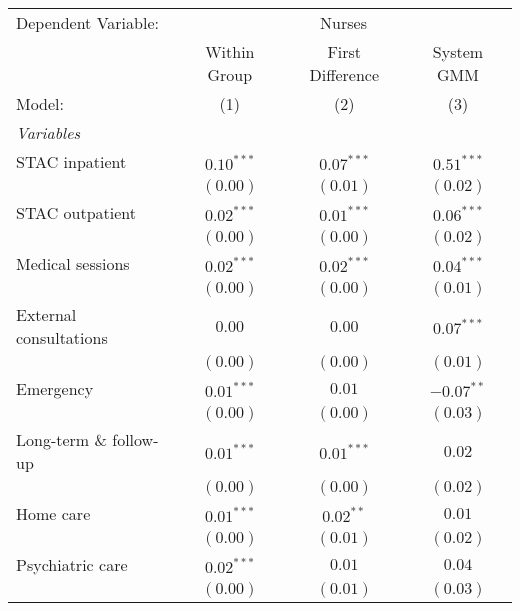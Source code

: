 
\begingroup
\centering
\begin{tabular}{lccc}
   \tabularnewline \midrule \midrule
   Dependent Variable:                 & \multicolumn{3}{c}{Nurses}                                   \\
                                       & Within Group               & First Difference & System GMM   \\
   Model:                              & (1)                        & (2)              & (3)          \\
   \midrule
   \emph{Variables}                                                                                   \\
   STAC inpatient                      & $0.10^{***}$               & $0.07^{***}$     & $0.51^{***}$ \\
                                       & $(0.00)$                   & $(0.01)$         & $(0.02)$     \\
   STAC outpatient                     & $0.02^{***}$               & $0.01^{***}$     & $0.06^{***}$ \\
                                       & $(0.00)$                   & $(0.00)$         & $(0.02)$     \\
   Medical sessions                    & $0.02^{***}$               & $0.02^{***}$     & $0.04^{***}$ \\
                                       & $(0.00)$                   & $(0.00)$         & $(0.01)$     \\
   External consultations              & $0.00$                     & $0.00$           & $0.07^{***}$ \\
                                       & $(0.00)$                   & $(0.00)$         & $(0.01)$     \\
   Emergency                           & $0.01^{***}$               & $0.01$           & $-0.07^{**}$ \\
                                       & $(0.00)$                   & $(0.00)$         & $(0.03)$     \\
   Long-term              \& follow-up & $0.01^{***}$               & $0.01^{***}$     & $0.02$       \\
                                       & $(0.00)$                   & $(0.00)$         & $(0.02)$     \\
   Home care                           & $0.01^{***}$               & $0.02^{**}$      & $0.01$       \\
                                       & $(0.00)$                   & $(0.01)$         & $(0.02)$     \\
   Psychiatric care                    & $0.02^{***}$               & $0.01$           & $0.04$       \\
                                       & $(0.00)$                   & $(0.01)$         & $(0.03)$     \\
   \midrule


\end{tabular}
